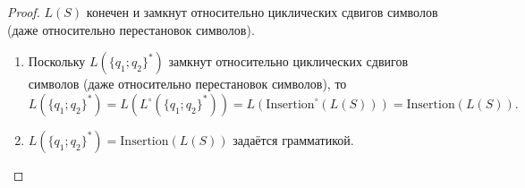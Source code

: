 \documentclass[12pt,a4paper]{article}
\newcommand{\Insertion}{\mathrm{Insertion}}
\newcommand{\Insertioncirc}{\mathrm{Insertion}^\circ}
\begin{document}
\begin{problem}{8}
\begin{enumerate}
                \begin{proof}
                    $L(S)$ конечен и замкнут относительно циклических сдвигов символов (даже относительно перестановок символов).
                    \begin{enumerate}
                        \item Поскольку $L(\{q_1; q_2\}^*)$ замкнут относительно циклических сдвигов символов (даже относительно перестановок символов), то
                            \[L(\{q_1; q_2\}^*) = L(L^\circ(\{q_1; q_2\}^*)) = L(\Insertioncirc(L(S))) = \Insertion(L(S)).\]
                        \item $L(\{q_1; q_2\}^*) = \Insertion(L(S))$ задаётся грамматикой.
                    \end{enumerate}
                \end{proof}
        \end{enumerate}
    \end{problem}
\end{document}

